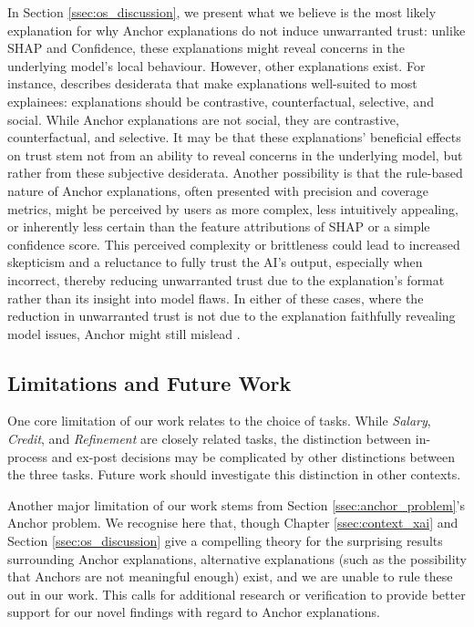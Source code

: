 In Section \ref{ssec:os_discussion}, we present what we believe is the most likely explanation for why Anchor explanations do not induce unwarranted trust: unlike SHAP and Confidence, these explanations might reveal concerns in the underlying model's local behaviour. However, other explanations exist. For instance, \textcite{miller_explanation_2017} describes desiderata that make explanations well-suited to most explainees: explanations should be contrastive, counterfactual, selective, and social. While Anchor explanations are not social, they are contrastive, counterfactual, and selective. It may be that these explanations' beneficial effects on trust stem not from an ability to reveal concerns in the underlying model, but rather from these subjective desiderata. Another possibility is that the rule-based nature of Anchor explanations, often presented with precision and coverage metrics, might be perceived by users as more complex, less intuitively appealing, or inherently less certain than the feature attributions of SHAP or a simple confidence score. This perceived complexity or brittleness could lead to increased skepticism and a reluctance to fully trust the AI's output, especially when incorrect, thereby reducing unwarranted trust due to the explanation's format rather than its insight into model flaws. In either of these cases, where the reduction in unwarranted trust is not due to the explanation faithfully revealing model issues, Anchor might still mislead \cite{Lipton}.

\subsection{Limitations and Future Work}
One core limitation of our work relates to the choice of tasks. While \emph{Salary}, \emph{Credit}, and \emph{Refinement} are closely related tasks, the distinction between in-process and ex-post decisions may be complicated by other distinctions between the three tasks. Future work should investigate this distinction in other contexts.

Another major limitation of our work stems from Section \ref{ssec:anchor_problem}'s Anchor problem. We recognise here that, though Chapter \ref{ssec:context_xai} and Section \ref{ssec:os_discussion} give a compelling theory for the surprising results surrounding Anchor explanations, alternative explanations (such as the possibility that Anchors are not meaningful enough) exist, and we are unable to rule these out in our work. This calls for additional research or verification to provide better support for our novel findings with regard to Anchor explanations.

